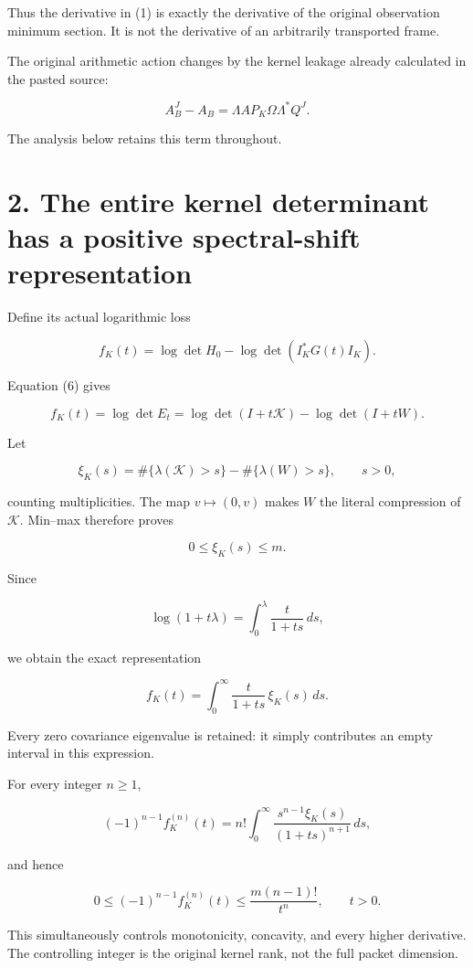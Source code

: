 \documentclass[11pt]{article}
\begin{document}
Thus the derivative in (1) is exactly the derivative of the original observation minimum section. It is not the derivative of an arbitrarily transported frame.

The original arithmetic action changes by the kernel leakage already calculated in the pasted source:

\[
A_B^J-A_B
=\Lambda A P_K\Omega\Lambda^*Q^J.
\]

The analysis below retains this term throughout.

\section{2. The entire kernel determinant has a positive spectral-shift representation}\label{the-entire-kernel-determinant-has-a-positive-spectral-shift-representation}

Define its actual logarithmic loss

\[
f_K(t)
=
\log\det H_0-\log\det(I_K^*G(t)I_K).
\]

Equation (6) gives

\[
\boxed{
f_K(t)
=\log\det E_t
=\log\det(I+t\mathcal K)-\log\det(I+tW).
}
\tag{7}
\]

Let

\[
\xi_K(s)
=
\#\{\lambda(\mathcal K)>s\}
-\#\{\lambda(W)>s\},
\qquad s>0,
\]

counting multiplicities. The map \(v\mapsto(0,v)\) makes \(W\) the literal compression of \(\mathcal K\). Min--max therefore proves

\[
0\le\xi_K(s)\le m.
\tag{8}
\]

Since

\[
\log(1+t\lambda)
=\int_0^\lambda\frac{t}{1+ts}\,ds,
\]

we obtain the exact representation

\[
\boxed{
f_K(t)=
\int_0^\infty\frac{t}{1+ts}\,\xi_K(s)\,ds.
}
\tag{9}
\]

Every zero covariance eigenvalue is retained: it simply contributes an empty interval in this expression.

For every integer \(n\ge1\),

\[
\boxed{
(-1)^{n-1}f_K^{(n)}(t)
=
n!\int_0^\infty
\frac{s^{n-1}\xi_K(s)}{(1+ts)^{n+1}}\,ds,
}
\]

and hence

\[
\boxed{
0\le(-1)^{n-1}f_K^{(n)}(t)
\le \frac{m(n-1)!}{t^n},
\qquad t>0.
}
\tag{10}
\]

This simultaneously controls monotonicity, concavity, and every higher derivative. The controlling integer is the original kernel rank, not the full packet dimension.
\end{document}
